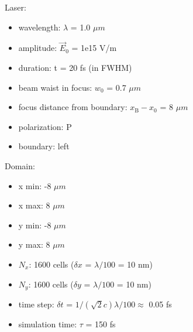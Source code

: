 \noindent
Laser:
\begin{itemize}
	\item wavelength: $ \lambda $ = 1.0 $ \mu m $
	\item amplitude: $ \vec{E}_0 $ = 1e15 V/m
	\item duration: t = 20 fs (in FWHM)
	\item beam waist in focus: $ w_0 $ = 0.7 $ \mu m $
	\item focus distance from boundary: $ x_\mathrm{B} - x_0 $ = 8 $ \mu m $
	\item polarization: P
	\item boundary: left 
\end{itemize}
Domain:
\begin{itemize}
	\item x min: -8 $ \mu m $
	\item x max: 8 $ \mu m $
	\item y min: -8 $ \mu m $
	\item y max: 8 $ \mu m $
	\item $ N_x $: 1600 cells ($ \delta x $ = $ \lambda/100 $ = 10 nm)
	\item $ N_y $: 1600 cells ($ \delta y $ = $ \lambda/100 $ = 10 nm)
	\item time step: $ \delta t $ = $ 1/(\sqrt{2} c) \lambda /100 \approx $ 0.05 fs 
	\item simulation time: $ \tau $ = 150 fs
\end{itemize}

